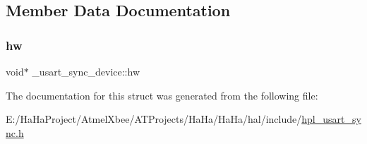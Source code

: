 \subsection{Member Data Documentation}
\mbox{\label{struct__usart__sync__device_a299ec1be7b3e3f53a8f8921823a3480c}} 
\subsubsection{\texorpdfstring{hw}{hw}}
{\footnotesize\ttfamily void$\ast$ \+\_\+usart\+\_\+sync\+\_\+device\+::hw}



The documentation for this struct was generated from the following file\+:\begin{DoxyCompactItemize}
\item 
E\+:/\+Ha\+Ha\+Project/\+Atmel\+Xbee/\+A\+T\+Projects/\+Ha\+Ha/\+Ha\+Ha/hal/include/\hyperlink{hpl__usart__sync_8h}{hpl\+\_\+usart\+\_\+sync.\+h}\end{DoxyCompactItemize}
